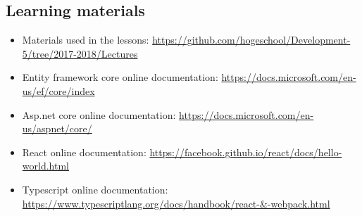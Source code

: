 \subsection{Learning materials}\label{learning-materials}
\begin{itemize}[nolistsep]
\item
  Materials used in the lessons:
  \url{https://github.com/hogeschool/Development-5/tree/2017-2018/Lectures}
\item
  Entity framework core online documentation:
  \url{https://docs.microsoft.com/en-us/ef/core/index}
\item
  Asp.net core online documentation:
  \url{https://docs.microsoft.com/en-us/aspnet/core/}
\item
  React online documentation:
  \url{https://facebook.github.io/react/docs/hello-world.html}
\item
  Typescript online documentation:
 \url{https://www.typescriptlang.org/docs/handbook/react-\&-webpack.html}
\end{itemize}

